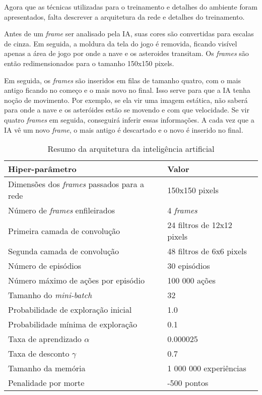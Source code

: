 Agora que as técnicas utilizadas para o treinamento e detalhes do ambiente foram apresentados, falta descrever a arquitetura da rede e detalhes do treinamento.

Antes de um \textit{frame} ser analisado pela IA, suas cores são convertidas para escalas de cinza.
Em seguida, a moldura da tela do jogo é removida, ficando visível apenas a área de jogo por onde a nave e os asteroides transitam.
Os \textit{frames} são então redimensionados para o tamanho 150x150 pixels.

Em seguida, os \textit{frames} são inseridos em filas de tamanho quatro, com o mais antigo ficando no começo e o mais novo no final. Isso serve para que a IA tenha noção de movimento.
Por exemplo, se ela vir uma imagem estática, não saberá para onde a nave e os asteróides estão se movendo e com que velocidade.
Se vir quatro \textit{frames} em seguida, conseguirá inferir essas informações.
A cada vez que a IA vê um novo \textit{frame}, o mais antigo é descartado e o novo é inserido no final.

\begin{table}
\centering
\begin{tabular}{| p{7cm} | p{7cm} |}
  \hline
  \textbf{Hiper-parâmetro} & \textbf{Valor} \\ \hline
  Dimensões dos \textit{frames} passados para a rede & 150x150 pixels \\ \hline
  Número de \textit{frames} enfileirados & 4 \textit{frames} \\ \hline
  Primeira camada de convolução & 24 filtros de 12x12 pixels \\ \hline
  Segunda camada de convolução & 48 filtros de 6x6 pixels \\ \hline
  Número de episódios & 30 episódios \\ \hline
  Número máximo de ações por episódio & 100 000 ações \\ \hline
  Tamanho do \textit{mini-batch} & 32 \\ \hline
  Probabilidade de exploração inicial & 1.0 \\ \hline
  Probabilidade mínima de exploração & 0.1 \\ \hline
  Taxa de aprendizado $\alpha$ & 0.000025 \\ \hline
  Taxa de desconto $\gamma$ & 0.7 \\ \hline
  Tamanho da memória & 1 000 000 experiências \\ \hline
  Penalidade por morte & -500 pontos \\ \hline
\end{tabular}
\caption{Resumo da arquitetura da inteligência artificial}
\label{table:2}
\end{table}

